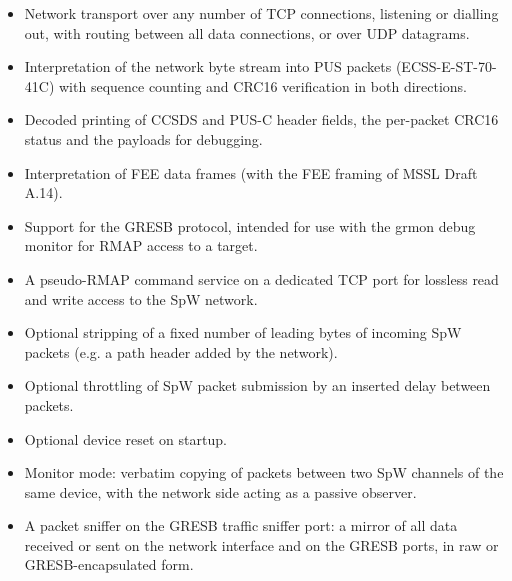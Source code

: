 \begin{itemize}

\item Network transport over any number of \gls{TCP} connections, listening or
dialling out, with routing between all data connections, or over \gls{UDP}
datagrams.\\

\item Interpretation of the network byte stream into \gls{PUS} packets
(ECSS-E-ST-70-41C) with sequence counting and CRC16 verification in both
directions.\\

\item Decoded printing of \gls{CCSDS} and PUS-C header fields, the per-packet
CRC16 status and the payloads for debugging.\\

\item Interpretation of FEE data frames (with the FEE framing of
\gls{MSSL} Draft A.14).\\

\item Support for the GRESB protocol, intended for use with the grmon debug
monitor for \gls{RMAP} access to a target.\\

\item A pseudo-\gls{RMAP} command service on a dedicated TCP port for
lossless read and write access to the \gls{SpW} network.\\

\item Optional stripping of a fixed number of leading bytes of incoming
\gls{SpW} packets (e.g. a path header added by the network).\\

\item Optional throttling of \gls{SpW} packet submission by an inserted delay
between packets.\\

\item Optional device reset on startup.\\

\item Monitor mode: verbatim copying of packets between two \gls{SpW} channels
of the same device, with the network side acting as a passive observer.\\

\item A packet sniffer on the GRESB traffic sniffer port: a mirror of all data
received or sent on the network interface and on the GRESB ports, in raw or
GRESB-encapsulated form.\\

\end{itemize}


